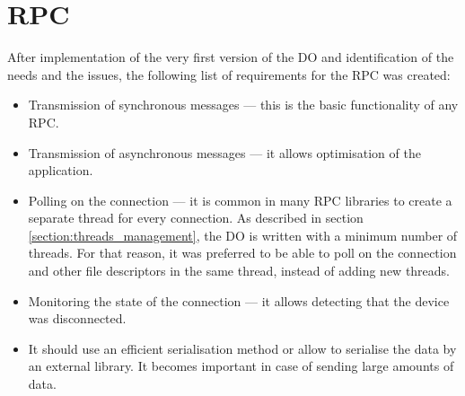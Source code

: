 \section{RPC}   \label{section:rpc_selection}
    After implementation of the very first version of the DO and identification of the needs and the issues, the following list of requirements for the RPC was created:
    \begin{itemize}
        \item Transmission of synchronous messages --- this is the basic functionality of any RPC.
        \item Transmission of asynchronous messages --- it allows optimisation of the application.
        \item Polling on the connection --- it is common in many RPC libraries to create a separate thread for every connection. As described in section \ref{section:threads_management}, the DO is written with a minimum number of threads. For that reason, it was preferred to be able to poll on the connection and other file descriptors in the same thread, instead of adding new threads.
        \item Monitoring the state of the connection --- it allows detecting that the device was disconnected.
        \item It should use an efficient serialisation method or allow to serialise the data by an external library. It becomes important in case of sending large amounts of data. 
    \end{itemize}
    
